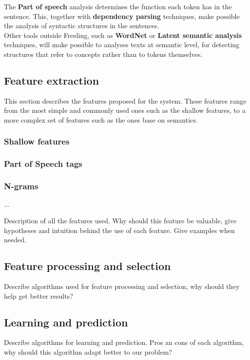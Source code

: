 \documentclass[12pt]{article}
\begin{document}
The \textbf{Part of speech} analysis determines the function each token has in the sentence. This, together with \textbf{dependency parsing} techniques, make possible the analysis of syntactic structures in the sentences.\\

Other tools outside Freeling, such as \textbf{WordNet} or \textbf{Latent semantic analysis} techniques, will make possible to analyses texts at semantic level, for detecting structures that refer to concepts rather than to tokens themselves.\\


\subsection{Feature extraction}
This section describes the features proposed for the system. These features range from the most simple and commonly used ones such as the shallow features, to a more complex set of features such as the ones base on semantics.

\subsubsection*{Shallow features}
\subsubsection*{Part of Speech tags}

\subsubsection*{N-grams}

...

Description of all the features used. Why should this feature be valuable, give hypotheses and intuition behind the use of each feature. Give examples when needed.

\subsection{Feature processing and selection}
Describe algorithms used for feature processing and selection, why should they help get better results?

\subsection{Learning and prediction}
Describe algorithms for learning and prediction. Pros an cons of each algorithm, why should this algorithm adapt better to our problem?
\end{document}
